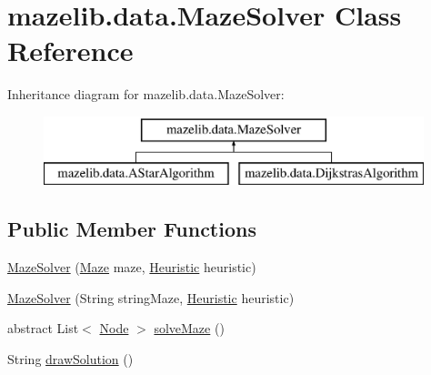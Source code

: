 \hypertarget{classmazelib_1_1data_1_1_maze_solver}{\section{mazelib.\-data.\-Maze\-Solver Class Reference}
\label{classmazelib_1_1data_1_1_maze_solver}
}
Inheritance diagram for mazelib.\-data.\-Maze\-Solver\-:\begin{figure}[H]
\begin{center}
\leavevmode
\includegraphics[height=2.000000cm]{classmazelib_1_1data_1_1_maze_solver}
\end{center}
\end{figure}
\subsection*{Public Member Functions}
\begin{DoxyCompactItemize}
\item 
\hyperlink{classmazelib_1_1data_1_1_maze_solver_a9d109ec788a834fb4af13e8d15690c1f}{Maze\-Solver} (\hyperlink{classmazelib_1_1data_1_1_maze}{Maze} maze, \hyperlink{interfacemazelib_1_1data_1_1_heuristic}{Heuristic} heuristic)
\item 
\hyperlink{classmazelib_1_1data_1_1_maze_solver_a45b8264a170235e86e9e2d304670d090}{Maze\-Solver} (String string\-Maze, \hyperlink{interfacemazelib_1_1data_1_1_heuristic}{Heuristic} heuristic)
\item 
abstract List$<$ \hyperlink{classmazelib_1_1data_1_1_node}{Node} $>$ \hyperlink{classmazelib_1_1data_1_1_maze_solver_a009bd983cdccfb7c845d3da8fabf02d6}{solve\-Maze} ()
\item 
String \hyperlink{classmazelib_1_1data_1_1_maze_solver_a314017420b6dc62fff186502d7e21dc2}{draw\-Solution} ()
\end{DoxyCompactItemize}
